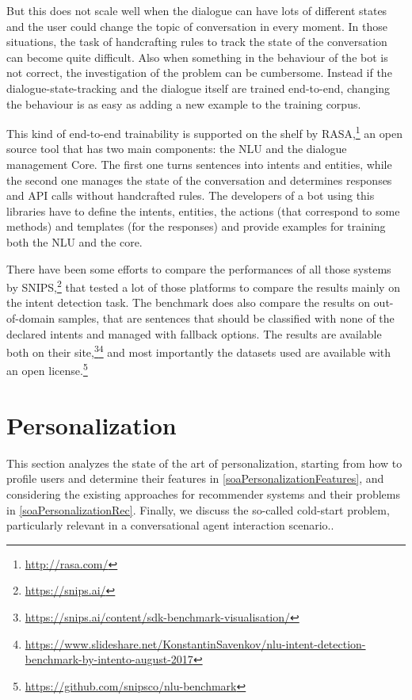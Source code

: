 But this does not scale well when the dialogue can have lots of different states and the user could change the topic of conversation in every moment. In those situations, the task of handcrafting rules to track the state of the conversation can become quite difficult. Also when something in the behaviour of the bot is not correct, the investigation of the problem can be cumbersome. Instead if the dialogue-state-tracking and the dialogue itself are trained end-to-end, changing the behaviour is as easy as adding a new example to the training corpus.

This kind of end-to-end trainability is supported on the shelf by RASA,\footnote{\url{http://rasa.com/}} an open source tool that has two main components: the NLU and the dialogue management Core. The first one turns sentences into intents and entities, while the second one manages the state of the conversation and determines responses and API calls without handcrafted rules. The developers of a bot using this libraries have to define the intents, entities, the actions (that correspond to some methods) and templates (for the responses) and provide examples for training both the NLU and the core.

There have been some efforts to compare the performances of all those systems by SNIPS,\footnote{\url{https://snips.ai/}} that tested a lot of those platforms to compare the results mainly on the intent detection task. The benchmark does also compare the results on out-of-domain samples, that are sentences that should be classified with none of the declared intents and managed with fallback options. The results are available both on their site,\footnote{\url{https://snips.ai/content/sdk-benchmark-visualisation/}}\footnote{\url{https://www.slideshare.net/KonstantinSavenkov/nlu-intent-detection-benchmark-by-intento-august-2017}} and most importantly the datasets used are available with an open license.\footnote{\url{https://github.com/snipsco/nlu-benchmark}}


\section{Personalization}
\label{soaPersonalization}

This section analyzes the state of the art of personalization, starting from how to profile users and determine their features in \ref{soaPersonalizationFeatures}, and considering the existing approaches for recommender systems and their problems in \ref{soaPersonalizationRec}. Finally, we discuss the so-called cold-start problem, particularly relevant in a conversational agent interaction scenario..


